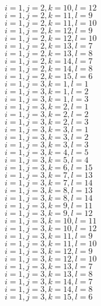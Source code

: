 \documentclass[14pt]{article}
\begin{document}
    $i=1,j=2,k=10,l=12 $ \\ 
    $i=1,j=2,k=11,l=9 $ \\ 
    $i=1,j=2,k=11,l=10 $ \\ 
    $i=1,j=2,k=12,l=9 $ \\ 
    $i=1,j=2,k=12,l=10 $ \\ 
    $i=1,j=2,k=13,l=7 $ \\ 
    $i=1,j=2,k=13,l=8 $ \\ 
    $i=1,j=2,k=14,l=7 $ \\ 
    $i=1,j=2,k=14,l=8 $ \\ 
    $i=1,j=2,k=15,l=6 $ \\ 
    $i=1,j=3,k=1,l=1 $ \\ 
    $i=1,j=3,k=1,l=2 $ \\ 
    $i=1,j=3,k=1,l=3 $ \\ 
    $i=1,j=3,k=2,l=1 $ \\ 
    $i=1,j=3,k=2,l=2 $ \\ 
    $i=1,j=3,k=2,l=3 $ \\ 
    $i=1,j=3,k=3,l=1 $ \\ 
    $i=1,j=3,k=3,l=2 $ \\ 
    $i=1,j=3,k=3,l=3 $ \\ 
    $i=1,j=3,k=4,l=5 $ \\ 
    $i=1,j=3,k=5,l=4 $ \\ 
    $i=1,j=3,k=6,l=15 $ \\ 
    $i=1,j=3,k=7,l=13 $ \\ 
    $i=1,j=3,k=7,l=14 $ \\ 
    $i=1,j=3,k=8,l=13 $ \\ 
    $i=1,j=3,k=8,l=14 $ \\ 
    $i=1,j=3,k=9,l=11 $ \\ 
    $i=1,j=3,k=9,l=12 $ \\ 
    $i=1,j=3,k=10,l=11 $ \\ 
    $i=1,j=3,k=10,l=12 $ \\ 
    $i=1,j=3,k=11,l=9 $ \\ 
    $i=1,j=3,k=11,l=10 $ \\ 
    $i=1,j=3,k=12,l=9 $ \\ 
    $i=1,j=3,k=12,l=10 $ \\ 
    $i=1,j=3,k=13,l=7 $ \\ 
    $i=1,j=3,k=13,l=8 $ \\ 
    $i=1,j=3,k=14,l=7 $ \\ 
    $i=1,j=3,k=14,l=8 $ \\ 
    $i=1,j=3,k=15,l=6 $ \\ 
\end{document}
